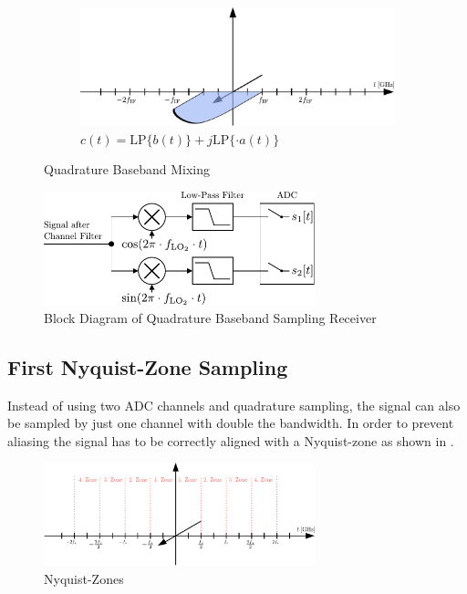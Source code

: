 \begin{figure}[p]
\begin{subfigure}{0.45\textwidth}
    \centering
    \includegraphics[width=\textwidth]{figures/rx_adc_1_freq_c}
    \caption{$c(t) = \text{LP}\{b(t)\} + j \text{LP}\{\cdot a(t)\}$}
    \label{fig:rx_adc_1_freq_c}
  \end{subfigure}
  \caption{Quadrature Baseband Mixing}
  \label{fig:rx_adc_1_freq}
\end{figure}

\begin{figure}[p]
  \centering
  \includegraphics[width=0.7\textwidth]{figures/rx_adc_1_bd}
  \caption{Block Diagram of Quadrature Baseband Sampling Receiver}
  \label{fig:rx_adc_1_bd}
\end{figure}

\subsection{First Nyquist-Zone Sampling}
\label{sec:rx_adc_0}
Instead of using two \gls{ADC} channels and quadrature sampling, the
signal can also be sampled by just one channel with double the
bandwidth. In order to prevent aliasing the signal has to be
correctly aligned with a Nyquist-zone as shown in
. \\

\begin{figure}[p]
  \centering
  \includegraphics[width=0.7\textwidth]{figures/rx_adc_2_nyquist_zones}
  \caption{Nyquist-Zones}
  \label{fig:rx_adc_2_nyquist_zones}
\end{figure}

